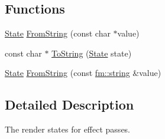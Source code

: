 \subsection*{Functions}
\begin{DoxyCompactItemize}
\item 
\hyperlink{namespaceFUDaePassState_a99a648050f80bc29359e932cffa8c973}{State} \hyperlink{namespaceFUDaePassState_a92d6cee907009a2310b957ce7dffe4c1}{FromString} (const char $\ast$value)
\item 
const char $\ast$ \hyperlink{namespaceFUDaePassState_a94b3bb7dbf36218b3e730b6929e31b08}{ToString} (\hyperlink{namespaceFUDaePassState_a99a648050f80bc29359e932cffa8c973}{State} state)
\item 
\hyperlink{namespaceFUDaePassState_a99a648050f80bc29359e932cffa8c973}{State} \hyperlink{namespaceFUDaePassState_a49ef0cbfa91760f3387ea195368cc7f8}{FromString} (const \hyperlink{classfm_1_1stringT}{fm::string} \&value)
\end{DoxyCompactItemize}


\subsection{Detailed Description}
The render states for effect passes. 


